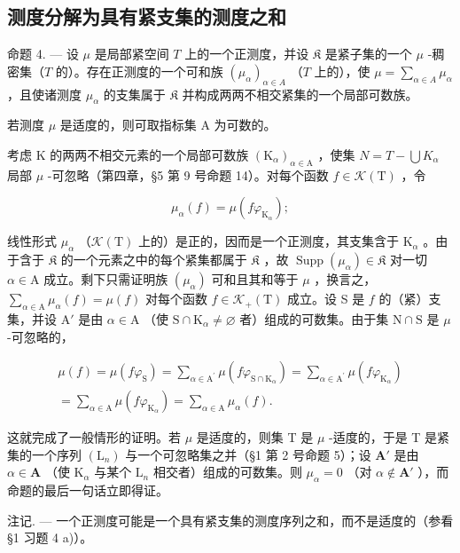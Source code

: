 \subsection{测度分解为具有紧支集的测度之和}

命题 4. --- 设 \(\mu\) 是局部紧空间 \(T\) 上的一个正测度，并设 \(\mathfrak{K}\) 是紧子集的一个 \(\mu\) -稠密集（\(T\) 的）。存在正测度的一个可和族 \((\mu_{\alpha})_{\alpha \in A}\) （\(T\) 上的），使 \(\mu = \sum_{\alpha \in A} \mu_{\alpha}\) ，且使诸测度 \(\mu_{\alpha}\) 的支集属于 \(\mathfrak{K}\) 并构成两两不相交紧集的一个局部可数族。

若测度 \(\mu\) 是适度的，则可取指标集 A 为可数的。

考虑 K 的两两不相交元素的一个局部可数族 \((\mathrm{K}_{\alpha})_{\alpha\in\mathrm{A}}\) ，使集 \(N = T - \bigcup K_{\alpha}\) 局部 \(\mu\) -可忽略（第四章，§5 第 9 号命题 14）。对每个函数 \(f \in \mathcal{K}(\mathrm{T})\) ，令

\[
\mu_ {\alpha} (f) = \mu (f \varphi_ {\mathrm{K} _ {\alpha}});
\]

线性形式 \(\mu_{\alpha}\) （\(\mathcal{K}(\mathrm{T})\) 上的）是正的，因而是一个正测度，其支集含于 \(\mathrm{K}_{\alpha}\) 。由于含于 \(\mathfrak{K}\) 的一个元素之中的每个紧集都属于 \(\mathfrak{K}\) ，故 \(\operatorname{Supp}(\mu_{\alpha}) \in \mathfrak{K}\) 对一切 \(\alpha \in \mathrm{A}\) 成立。剩下只需证明族 \((\mu_{\alpha})\) 可和且其和等于 \(\mu\) ，换言之，\(\sum_{\alpha \in \mathrm{A}} \mu_{\alpha}(f) = \mu(f)\) 对每个函数 \(f \in \mathcal{K}_{+}(\mathrm{T})\) 成立。设 S 是 \(f\) 的（紧）支集，并设 \(\mathrm{A}'\) 是由 \(\alpha \in \mathrm{A}\) （使 \(\mathrm{S} \cap \mathrm{K}_{\alpha} \neq \varnothing\) 者）组成的可数集。由于集 \(\mathrm{N} \cap \mathrm{S}\) 是 \(\mu\) -可忽略的，

\[
\begin{array}{c} \mu (f) = \mu (f \varphi_ {\mathrm{S}}) = \sum_ {\alpha \in \mathrm{A} ^ {\prime}} \mu (f \varphi_ {\mathrm{S} \cap \mathrm{K} _ {\alpha}}) = \sum_ {\alpha \in \mathrm{A} ^ {\prime}} \mu (f \varphi_ {\mathrm{K} _ {\alpha}}) \\ = \sum_ {\alpha \in \mathrm{A}} \mu (f \varphi_ {\mathrm{K} _ {\alpha}}) = \sum_ {\alpha \in \mathrm{A}} \mu_ {\alpha} (f). \end{array}
\]

这就完成了一般情形的证明。若 \(\mu\) 是适度的，则集 T 是 \(\mu\) -适度的，于是 T 是紧集的一个序列 \((\mathrm{L}_n)\) 与一个可忽略集之并（§1 第 2 号命题 5）；设 \(\mathbf{A}'\) 是由 \(\alpha \in \mathbf{A}\) （使 \(\mathrm{K}_{\alpha}\) 与某个 \(\mathrm{L}_n\) 相交者）组成的可数集。则 \(\mu_{\alpha} = 0\) （对 \(\alpha \notin \mathbf{A}'\) ），而命题的最后一句话立即得证。

注记. --- 一个正测度可能是一个具有紧支集的测度序列之和，而不是适度的（参看 §1 习题 4 a)）。


